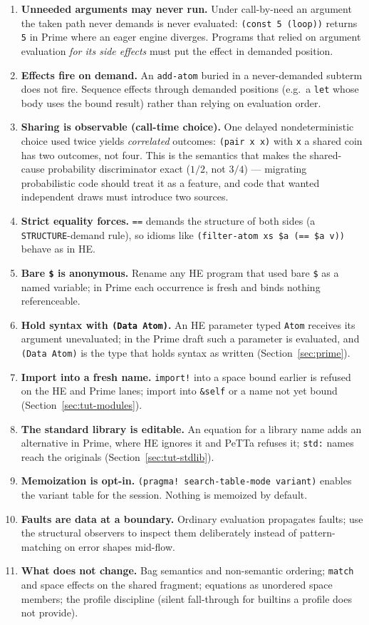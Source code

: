 \documentclass[11pt]{article}
\newcommand{\code}[1]{\texttt{#1}}
\newcommand{\PeTTa}{\textup{PeTTa}}
\newcommand{\HE}{\textup{HE}}
\begin{document}
\begin{enumerate}
\item \textbf{Unneeded arguments may never run.}  Under call-by-need an
  argument the taken path never demands is never evaluated:
  \code{(const 5 (loop))} returns \code{5} in Prime where an eager
  engine diverges.  Programs that relied on argument evaluation
  \emph{for its side effects} must put the effect in demanded position.
\item \textbf{Effects fire on demand.}  An \code{add-atom} buried in a
  never-demanded subterm does not fire.  Sequence effects through
  demanded positions (e.g.\ a \code{let} whose body uses the bound
  result) rather than relying on evaluation order.
\item \textbf{Sharing is observable (call-time choice).}  One delayed
  nondeterministic choice used twice yields \emph{correlated} outcomes:
  \code{(pair x x)} with \code{x} a shared coin has two outcomes, not
  four.  This is the semantics that makes the shared-cause probability
  discriminator exact ($1/2$, not $3/4$) --- migrating probabilistic
  code should treat it as a feature, and code that wanted independent
  draws must introduce two sources.
\item \textbf{Strict equality forces.}  \code{==} demands the structure
  of both sides (a \code{STRUCTURE}-demand rule), so idioms like
  \code{(filter-atom xs \$a (== \$a v))} behave as in \HE{}.
\item \textbf{Bare \code{\$} is anonymous.}  Rename any \HE{} program
  that used bare \code{\$} as a named variable; in Prime each occurrence
  is fresh and binds nothing referenceable.
\item \textbf{Hold syntax with \code{(Data Atom)}.}  An \HE{} parameter
  typed \code{Atom} receives its argument unevaluated; in the Prime draft such
  a parameter is evaluated, and \code{(Data Atom)} is the type that holds
  syntax as written (Section~\ref{sec:prime}).
\item \textbf{Import into a fresh name.}  \code{import!} into a space bound
  earlier is refused on the \HE{} and Prime lanes; import into \code{\&self}
  or a name not yet bound (Section~\ref{sec:tut-modules}).
\item \textbf{The standard library is editable.}  An equation for a library
  name adds an alternative in Prime, where \HE{} ignores it and \PeTTa{}
  refuses it; \code{std:} names reach the originals
  (Section~\ref{sec:tut-stdlib}).
\item \textbf{Memoization is opt-in.}  \code{(pragma!\ search-table-mode
  variant)} enables the variant table for the session.  Nothing is
  memoized by default.
\item \textbf{Faults are data at a boundary.}  Ordinary evaluation
  propagates faults; use the structural observers to inspect them
  deliberately instead of pattern-matching on error shapes mid-flow.
\item \textbf{What does not change.}  Bag semantics and non-semantic
  ordering; \code{match} and space effects on the shared fragment;
  equations as unordered space members; the profile discipline (silent
  fall-through for builtins a profile does not provide).
\end{enumerate}
\end{document}
